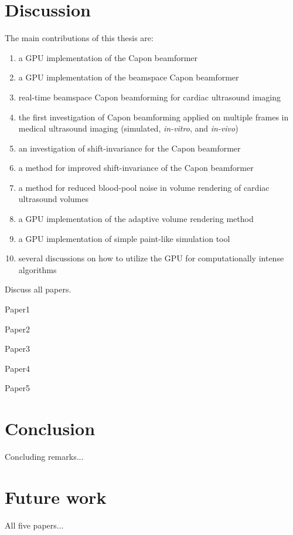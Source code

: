 \section{Discussion}
The main contributions of this thesis are:
\begin{enumerate}
\item a GPU implementation of the Capon beamformer
\item a GPU implementation of the beamspace Capon beamformer
\item real-time beamspace Capon beamforming for cardiac ultrasound imaging
\item the first investigation of Capon beamforming applied on multiple frames in medical ultrasound imaging (simulated, \textit{in-vitro}, and \textit{in-vivo})
\item an investigation of shift-invariance for the Capon beamformer
\item a method for improved shift-invariance of the Capon beamformer
\item a method for reduced blood-pool noise in volume rendering of cardiac ultrasound volumes
\item a GPU implementation of the adaptive volume rendering method
\item a GPU implementation of simple paint-like simulation tool
\item several discussions on how to utilize the GPU for computationally intense algorithms  
\end{enumerate}

Discuss all papers.

Paper1

Paper2

Paper3

Paper4

Paper5

\section{Conclusion}

Concluding remarks...

\section{Future work}

All five papers...

\endinput